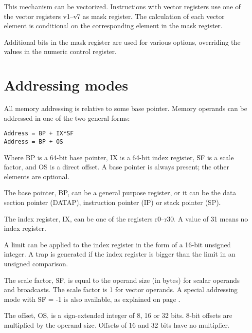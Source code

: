 \documentclass[forwardcom.tex]{subfiles}
\begin{document}
This mechanism can be vectorized. Instructions with vector registers use one of the vector registers v1--v7 as mask register. The calculation of each vector element is conditional on the corresponding element in the mask register.
\vspace{2mm}

Additional bits in the mask register are used for various options, overriding the values in the numeric control register.

\section{Addressing modes}
All memory addressing is relative to some base pointer. Memory operands can be addressed in one of the two general forms:

\begin{lstlisting}
Address = BP + IX*SF
Address = BP + OS
\end{lstlisting}

Where BP is a 64-bit base pointer, IX is a 64-bit index register, SF is a scale factor, and OS is a direct offset. A base pointer is always present; the other elements are optional. 
\vspace{2mm}

The base pointer, BP, can be a general purpose register, or it can be the data section pointer (DATAP), instruction pointer (IP) or stack pointer (SP).
\vspace{2mm}

The index register, IX, can be one of the registers r0--r30. A value of 31 means no index register.
\vspace{2mm}

A limit can be applied to the index register in the form of a 16-bit unsigned integer. A trap is generated if the index register is bigger than the limit in an unsigned comparison.
\vspace{2mm}

The scale factor, SF, is equal to the operand size (in bytes) for scalar operands and broadcasts. The scale factor is 1 for vector operands. A special addressing mode with 
SF = -1 
is also available, as explained on page \pageref{vectorLoops}.
\vspace{2mm}

The offset, OS, is a sign-extended integer of 8, 16 or 32 bits. 8-bit offsets are multiplied by the operand size. Offsets of 16 and 32 bits have no multiplier.
\vspace{2mm}
\end{document}
